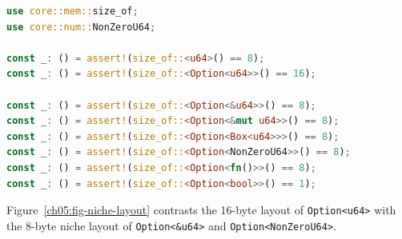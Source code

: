 \begin{lstlisting}[language=Rust]
use core::mem::size_of;
use core::num::NonZeroU64;

const _: () = assert!(size_of::<u64>() == 8);
const _: () = assert!(size_of::<Option<u64>>() == 16);

const _: () = assert!(size_of::<Option<&u64>>() == 8);
const _: () = assert!(size_of::<Option<&mut u64>>() == 8);
const _: () = assert!(size_of::<Option<Box<u64>>>() == 8);
const _: () = assert!(size_of::<Option<NonZeroU64>>() == 8);
const _: () = assert!(size_of::<Option<fn()>>() == 8);
const _: () = assert!(size_of::<Option<bool>>() == 1);
\end{lstlisting}

Figure~\ref{ch05:fig-niche-layout} contrasts the 16-byte layout of \texttt{Option<u64>} with the 8-byte niche layout of \texttt{Option<\&u64>} and \texttt{Option<NonZeroU64>}.

